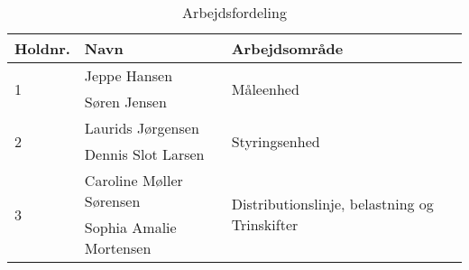 \begin{table}[H]
	\centering
	\caption{Arbejdsfordeling}
	\label{tab:arbejdsfordeling}
	\begin{tabular}{@{}lll@{}}
		\toprule
		Holdnr.            & Navn                    & Arbejdsområde                                                  \\ \midrule
		\multirow{2}{*}{1} & Jeppe Hansen            & \multirow{2}{*}{Måleenhed}                                     \\
		& Søren Jensen            &                                                                \\\midrule
		\multirow{2}{*}{2} & Laurids Jørgensen       & \multirow{2}{*}{Styringsenhed}                                 \\
		& Dennis Slot Larsen            &                                                                \\\midrule
		\multirow{2}{*}{3} & Caroline Møller Sørensen         & \multirow{2}{*}{Distributionslinje, belastning og Trinskifter} \\
		& Sophia Amalie Mortensen &                                                                \\ \midrule
	\end{tabular}
\end{table}

